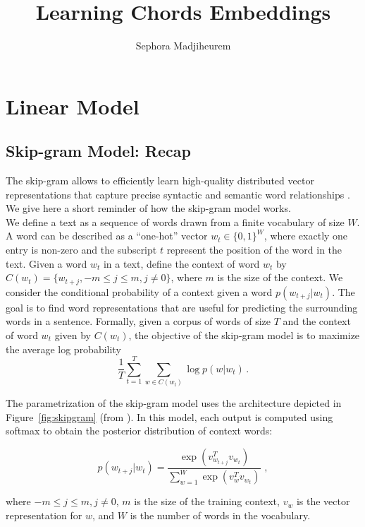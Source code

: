 \documentclass[12pt]{article}\pagestyle{myheadings}
\title{Learning Chords Embeddings}
\author{Sephora Madjiheurem}
\begin{document}
\maketitle

\section{Linear Model}
\subsection{Skip-gram Model: Recap}

The skip-gram allows to efficiently learn high-quality distributed vector representations that capture precise syntactic and semantic word relationships \citep{mik2013}. We give here a short reminder of how the skip-gram model works. \\


We define a text as a sequence of words drawn from a finite vocabulary of size $W$. A word can be described as a ``one-hot'' vector $w_t \in \{0,1\}^W$, where exactly one entry is non-zero and the subscript $t$ represent the position of the word in the text.  
Given a  word $w_t$ in a text, define the context of word $w_t$ by $ C(w_t) = \{w_{t+j}, -m \leq j \leq m , j \neq 0\}$, where $m$ is the size of the context. We consider the conditional probability of a context given a word  $p(w_{t+j}|w_t)$.  The goal is to find word representations that are useful for predicting the surrounding words in a sentence. Formally, given a corpus of words of size $T$ and the context of word $w_t$ given by $C(w_t)$, the objective of the skip-gram model is to maximize the average log probability 
\begin{equation}
\frac{1}{T} \sum_{t=1}^T \sum_{w \in C(w_t)} \log p(w|w_t)\,.
\label{eq:objective}
\end{equation}

The parametrization of the skip-gram model uses the architecture depicted in Figure~\ref{fig:skipgram} (from \citet{mik2013}). In this model, each output is computed using softmax to obtain the posterior distribution of context words:

\begin{equation}
p(w_{t+j}|w_t) = \frac{ \exp (v_{w_{t+j}}^T v_{w_t})}{\sum_{w=1}^W \exp (v_{w}^T v_{w_t})} \,\,,
\end{equation}

where $-m \leq j \leq m, j\neq 0$, $m$ is the size of the training context,  $v_w$ is the vector representation for $w$, and $W$ is the number of words in the vocabulary. \\
\end{document}
